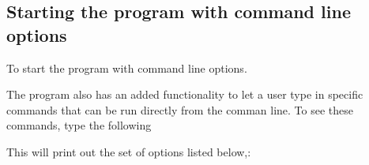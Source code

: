 \documentclass[letterpaper,10pt,english]{sphinxmanual}
\begin{document}
\begin{sphinxVerbatim}[commandchars=\\\{\}]

  
  
    
  
  
  

   


 
\end{sphinxVerbatim}


\subsection{Starting the program with command line options}
\label{\detokenize{extras/quickstart:starting-the-program-with-command-line-options}}
\sphinxAtStartPar
To start the program with command line options.

\sphinxAtStartPar
The program also has an added functionality to let a user type in specific commands that can be run directly
from the comman line.
To see these commands, type the following

\begin{sphinxVerbatim}[commandchars=\\\{\}]
 
\end{sphinxVerbatim}

\sphinxAtStartPar
This will print out the set of options listed below,:
\end{document}
